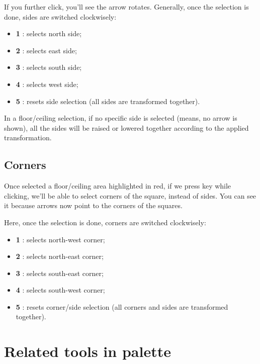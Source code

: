 \par If you further click, you'll see the arrow rotates. Generally, once the selection is done, sides are switched clockwisely:
\begin{itemize}
    \item \textbf{1 }: selects north side;
    \item \textbf{2 }: selects east side;
    \item \textbf{3 }: selects south side;
    \item \textbf{4 }: selects west side;
    \item \textbf{5 }: resets side selection (all sides are transformed together).
\end{itemize}

\begin{remark}
    In a floor/ceiling selection, if no specific side is selected (means, no arrow is shown), all the sides will be raised or lowered together according to the applied transformation.
\end{remark}

\section{Corners}

Once selected a floor/ceiling area highlighted in red, if we press  key while clicking, we'll be able to select corners of the square, instead of sides. You can see it because arrows now point to the corners of the squares.
\par Here, once the selection is done, corners are switched clockwisely:
\begin{itemize}
    \item \textbf{1 }: selects north-west corner;
    \item \textbf{2 }: selects north-east corner;
    \item \textbf{3 }: selects south-east corner;
    \item \textbf{4 }: selects south-west corner;
    \item \textbf{5 }: resets corner/side selection (all corners and sides are transformed together).
\end{itemize}

\chapter{Related tools in palette}

